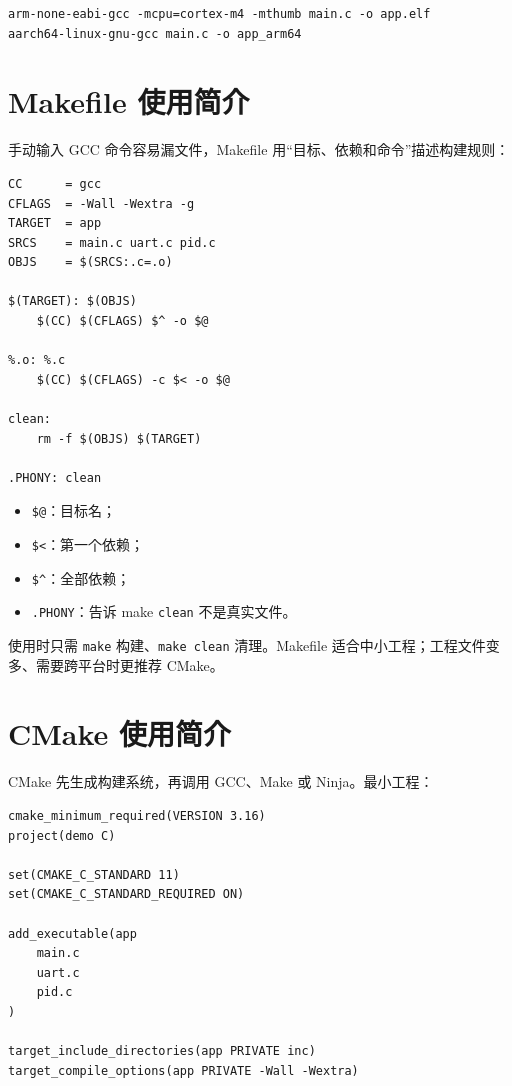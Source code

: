 \begin{lstlisting}
arm-none-eabi-gcc -mcpu=cortex-m4 -mthumb main.c -o app.elf
aarch64-linux-gnu-gcc main.c -o app_arm64
\end{lstlisting}

\section{Makefile 使用简介}

手动输入 GCC 命令容易漏文件，Makefile 用“目标、依赖和命令”描述构建规则：

\begin{lstlisting}
CC      = gcc
CFLAGS  = -Wall -Wextra -g
TARGET  = app
SRCS    = main.c uart.c pid.c
OBJS    = $(SRCS:.c=.o)

$(TARGET): $(OBJS)
	$(CC) $(CFLAGS) $^ -o $@

%.o: %.c
	$(CC) $(CFLAGS) -c $< -o $@

clean:
	rm -f $(OBJS) $(TARGET)

.PHONY: clean
\end{lstlisting}

\begin{itemize}
\item \texttt{\$@}：目标名；
\item \texttt{\$<}：第一个依赖；
\item \texttt{\${\string^}}：全部依赖；
\item \texttt{.PHONY}：告诉 make \texttt{clean} 不是真实文件。
\end{itemize}

使用时只需 \texttt{make} 构建、\texttt{make clean} 清理。Makefile 适合中小工程；工程文件变多、需要跨平台时更推荐 CMake。

\section{CMake 使用简介}

CMake 先生成构建系统，再调用 GCC、Make 或 Ninja。最小工程：

\begin{lstlisting}
cmake_minimum_required(VERSION 3.16)
project(demo C)

set(CMAKE_C_STANDARD 11)
set(CMAKE_C_STANDARD_REQUIRED ON)

add_executable(app
    main.c
    uart.c
    pid.c
)

target_include_directories(app PRIVATE inc)
target_compile_options(app PRIVATE -Wall -Wextra)
\end{lstlisting}


